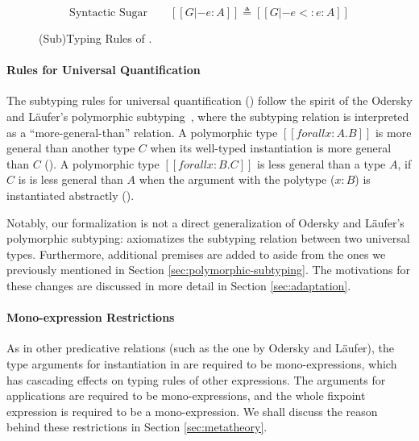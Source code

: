 \begin{figure}
    \begin{equation*}
       \text{Syntactic Sugar} \qquad [[G |- e : A]] \triangleq [[G |- e <: e : A]]
    \end{equation*}
    \caption{(Sub)Typing Rules of \name.}
    \label{fig:typing}
\end{figure}

\paragraph{Rules for Universal Quantification}
The subtyping rules for universal quantification () follow
the spirit of the Odersky and L\"aufer's polymorphic subtyping~\cite{odersky1996putting,dunfield2013complete},
where the subtyping relation is interpreted as a ``more-general-than'' relation.
A polymorphic type $[[forall x : A. B]]$
is more general than another type $C$ when its well-typed
instantiation is more general than $C$ (). A polymorphic
type $[[forall x : B. C]]$ is less general than a type $A$,
if $C$ is is less general than $A$ when the argument with the polytype ($x:B$)
is instantiated abstractly ().

Notably, our formalization is not a direct generalization of Odersky and L\"aufer's
polymorphic subtyping:
 axiomatizes the subtyping relation between two universal types.
Furthermore, additional premises are added to  aside from the
ones we previously mentioned in Section \ref{sec:polymorphic-subtyping}.
The motivations for these changes are discussed in more detail in Section \ref{sec:adaptation}.

\paragraph{Mono-expression Restrictions}
As in other predicative relations (such as the one by Odersky and L\"aufer),
the type arguments for instantiation in  are
required to be mono-expressions, which has cascading effects on typing rules of
other expressions. The arguments for applications are required to be
mono-expressions, and the whole fixpoint expression is required to be a
mono-expression. We shall
discuss the reason behind these restrictions in Section \ref{sec:metatheory}.

